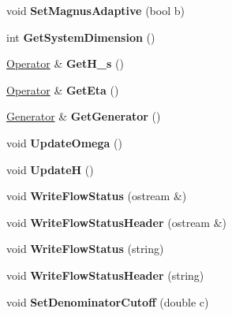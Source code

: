 \begin{DoxyCompactItemize}
void {\bfseries Set\+Magnus\+Adaptive} (bool b)
\item 
\mbox{\label{classIMSRGSolver_a30dfd1319a04a17dc0c295a664a186d1}} 
int {\bfseries Get\+System\+Dimension} ()
\item 
\mbox{\label{classIMSRGSolver_a7c89d669e4f020877219dc427da9dacd}} 
\hyperlink{classOperator}{Operator} \& {\bfseries Get\+H\+\_\+s} ()
\item 
\mbox{\label{classIMSRGSolver_a67e05391a23d30b314edebcaa88a3783}} 
\hyperlink{classOperator}{Operator} \& {\bfseries Get\+Eta} ()
\item 
\mbox{\label{classIMSRGSolver_a8ae5dfd337ea64d1ed86dbcb9998f4f8}} 
\hyperlink{classGenerator}{Generator} \& {\bfseries Get\+Generator} ()
\item 
\mbox{\label{classIMSRGSolver_a204f2765bc49886dde4260213fd78411}} 
void {\bfseries Update\+Omega} ()
\item 
\mbox{\label{classIMSRGSolver_a4cf93770fe9a71ef3068603cfaba3414}} 
void {\bfseries UpdateH} ()
\item 
\mbox{\label{classIMSRGSolver_a46d9e83fd8417419ebbfa8fd927da991}} 
void {\bfseries Write\+Flow\+Status} (ostream \&)
\item 
\mbox{\label{classIMSRGSolver_a23a29b966b230c3025b21868d6e39b02}} 
void {\bfseries Write\+Flow\+Status\+Header} (ostream \&)
\item 
\mbox{\label{classIMSRGSolver_aacfdcf9ad31406125386bae66cf7adae}} 
void {\bfseries Write\+Flow\+Status} (string)
\item 
\mbox{\label{classIMSRGSolver_a480bd4154faca5ec9795c3a95f348eb8}} 
void {\bfseries Write\+Flow\+Status\+Header} (string)
\item 
\mbox{\label{classIMSRGSolver_ade0ba3cb00389303f4eb1e5a502ab3cf}} 
void {\bfseries Set\+Denominator\+Cutoff} (double c)
\item 

\end{DoxyCompactItemize}
